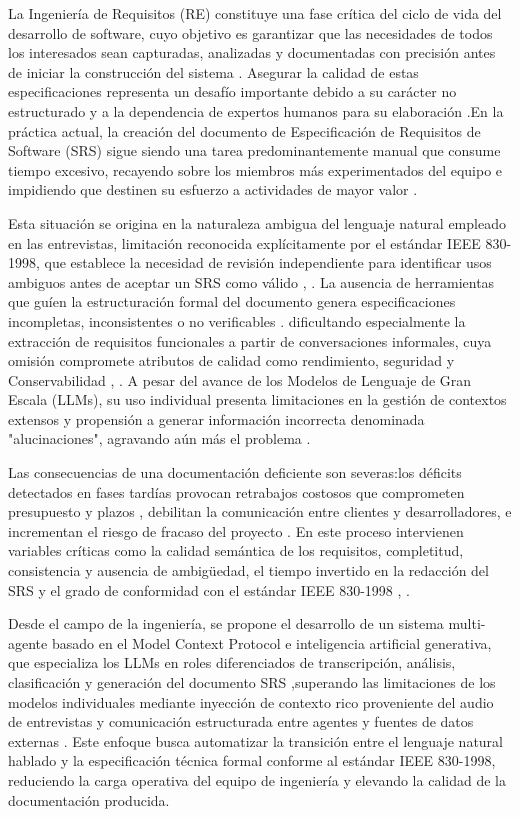 La Ingeniería de Requisitos (RE) constituye una fase crítica del ciclo de vida del desarrollo de software, cuyo objetivo es garantizar que las necesidades de todos los interesados 
sean capturadas, analizadas y documentadas con precisión antes de iniciar la construcción del sistema \cite{Wolf2026}.  Asegurar la calidad de estas especificaciones representa un 
desafío importante debido a su carácter no estructurado y a la dependencia de expertos humanos para su elaboración \cite{Wolf2026}.En la práctica actual, la creación del documento 
de Especificación de Requisitos de Software (SRS) sigue siendo una tarea predominantemente manual que consume tiempo excesivo, recayendo sobre los miembros más experimentados del 
equipo e impidiendo que destinen su esfuerzo a actividades de mayor valor \cite{Rahman2024}.

Esta situación se origina en la naturaleza ambigua del lenguaje natural empleado en las entrevistas, limitación reconocida explícitamente por el estándar IEEE 830-1998, 
que establece la necesidad de revisión independiente para identificar usos ambiguos antes de aceptar un SRS como válido \cite{doe2011recommended}, \cite{ieee1984ieee}. 
La ausencia de herramientas que guíen la estructuración formal del documento genera especificaciones incompletas, inconsistentes o no verificables \cite{ieee1984ieee}. 
dificultando especialmente la extracción de requisitos funcionales a partir de conversaciones informales, cuya omisión compromete atributos de calidad como rendimiento, 
seguridad y Conservabilidad \cite{Umar2024}, \cite{Mukaida2025}. A pesar del avance de los Modelos de Lenguaje de Gran Escala (LLMs), su uso individual presenta limitaciones 
en la gestión de contextos extensos y propensión a generar información incorrecta denominada "alucinaciones", agravando aún más el problema \cite{Rahman2024}.

Las consecuencias de una documentación deficiente son severas:los déficits detectados en fases tardías provocan retrabajos costosos que comprometen presupuesto 
y plazos \cite{Wolf2026}, 
debilitan la comunicación entre clientes y desarrolladores, e incrementan el riesgo de fracaso del proyecto \cite{Umar2024}. En este proceso intervienen variables 
críticas como la calidad semántica de los requisitos, completitud, consistencia y ausencia de ambigüedad\cite{Akhtar2025}, el tiempo invertido en la redacción del 
SRS y el grado de conformidad con el estándar IEEE 830-1998 \cite{ieee1984ieee}, \cite{Hoy2023}.

Desde el campo de la ingeniería, se propone el desarrollo de un sistema multi-agente basado en el Model Context Protocol e inteligencia artificial generativa, que 
especializa los LLMs en roles diferenciados de transcripción, análisis, clasificación y generación del documento SRS \cite{Guo2024},superando las limitaciones de los 
modelos individuales mediante inyección de contexto rico proveniente del audio de entrevistas y comunicación estructurada entre agentes y fuentes de datos externas \cite{Ray2025}. 
Este enfoque busca automatizar la transición entre el lenguaje natural hablado y la especificación técnica formal conforme al estándar IEEE 830-1998, reduciendo la carga operativa 
del equipo de ingeniería y elevando la calidad de la documentación producida.

